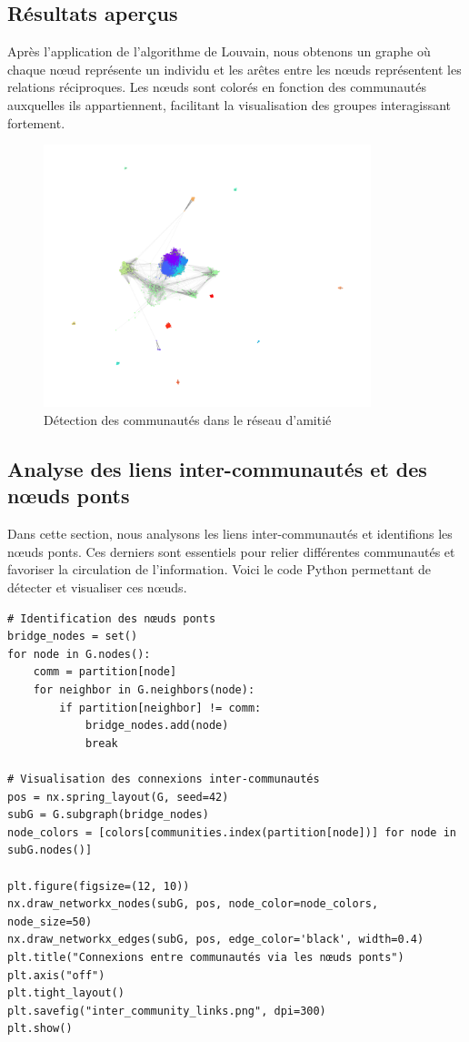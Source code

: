 \documentclass[a4paper, 12pt, twoside]{article}
\begin{document}
\newpage
\subsection{Résultats aperçus}

Après l'application de l'algorithme de Louvain, nous obtenons un graphe où chaque nœud représente un individu et les arêtes entre les nœuds représentent les relations réciproques. Les nœuds sont colorés en fonction des communautés auxquelles ils appartiennent, facilitant la visualisation des groupes interagissant fortement.

\begin{figure}[H]
    \centering
    \includegraphics[width=0.85\textwidth]{detection_communaute.png}
    \caption{Détection des communautés dans le réseau d'amitié}
    \label{fig:communaute}
\end{figure}

\newpage
\subsection{Analyse des liens inter-communautés et des nœuds ponts}

Dans cette section, nous analysons les liens inter-communautés et identifions les nœuds ponts. Ces derniers sont essentiels pour relier différentes communautés et favoriser la circulation de l'information. Voici le code Python permettant de détecter et visualiser ces nœuds.

\begin{lstlisting}
# Identification des nœuds ponts
bridge_nodes = set()
for node in G.nodes():
    comm = partition[node]
    for neighbor in G.neighbors(node):
        if partition[neighbor] != comm:
            bridge_nodes.add(node)
            break

# Visualisation des connexions inter-communautés
pos = nx.spring_layout(G, seed=42)
subG = G.subgraph(bridge_nodes)
node_colors = [colors[communities.index(partition[node])] for node in subG.nodes()]

plt.figure(figsize=(12, 10))
nx.draw_networkx_nodes(subG, pos, node_color=node_colors, node_size=50)
nx.draw_networkx_edges(subG, pos, edge_color='black', width=0.4)
plt.title("Connexions entre communautés via les nœuds ponts")
plt.axis("off")
plt.tight_layout()
plt.savefig("inter_community_links.png", dpi=300)
plt.show()
\end{lstlisting}
\end{document}
